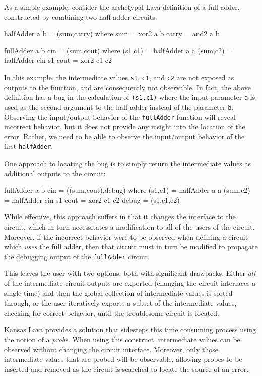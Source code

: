 \documentclass{llncs}
\begin{document}
As a simple example, consider the archetypal Lava definition of a full adder,
constructed by combining two half adder circuits:

\begin{code}
halfAdder a b = (sum,carry)
  where sum = xor2 a b
        carry = and2 a b

fullAdder a b cin = (sum,cout)
  where (s1,c1) = halfAdder a a
        (sum,c2) = halfAdder cin s1
        cout = xor2 c1 c2
\end{code}

In this example, the intermediate values \verb!s1!, \verb!c1!, and \verb!c2! are
not exposed as outputs to the function, and are consequently not
observable. In fact, the above definition has a bug in the calculation of
\verb!(s1,c1)! where the input parameter \verb!a! is used as the second argument
to the half adder instead of the parameter \verb!b!. Observing the input/output
behavior of the \verb!fullAdder! function will reveal incorrect behavior, but it
does not provide any insight into the location of the error. Rather, we need to
be able to observe the input/output behavior of the first \verb!halfAdder!.

One approach to locating the bug is to simply return the intermediate values as
additional outputs to the circuit:

\begin{code}
fullAdder a b cin = ((sum,cout),debug)
  where (s1,c1) = halfAdder a a
        (sum,c2) = halfAdder cin s1
        cout = xor2 c1 c2
        debug = (s1,c1,c2)
\end{code}

While effective, this approach suffers in that it changes the interface to the
circuit, which in turn necessitates a modification to all of the users of the
circuit. Moreover, if the incorrect behavior were to be observed when defining a
circuit which \emph{uses} the full adder, then that circuit must in turn be
modified to propagate the debugging output of the \verb!fullAdder! circuit.

This leaves the user with two options, both with
significant drawbacks. Either \emph{all} of the intermediate circuit outputs are
exported (changing the circuit interfaces a single time) and then the global
collection of intermediate values is sorted through, or the user 
iteratively exports a subset of the intermediate values, checking for correct
behavior, until the troublesome circuit is located.

Kansas Lava provides a solution that sidesteps this time consuming process
using the notion of a \emph{probe}. When using this construct,
intermediate values can be observed without changing the circuit
interface. Moreover, only those intermediate values that are probed will be
observable, allowing probes to be inserted and removed as the circuit is
searched to locate the source of an error.
\end{document}
